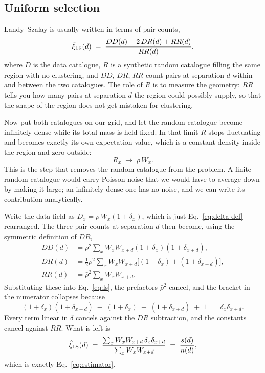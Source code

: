 \documentclass[12pt]{article}
\newcommand{\W}{W}
\begin{document}
\subsection{Uniform selection}\label{sec:ls-uniform}

Landy--Szalay is usually written in terms of pair counts,
\begin{equation}\label{eq:ls}
  \hat\xi_{\rm LS}(d) \;=\; \frac{DD(d) - 2\,DR(d) + RR(d)}{RR(d)} ,
\end{equation}
where $D$ is the data catalogue, $R$ is a synthetic random catalogue filling
the same region with no clustering, and $DD$, $DR$, $RR$ count pairs at
separation $d$ within and between the two catalogues.  The role of $R$ is to
measure the geometry: $RR$ tells you how many pairs at separation $d$ the
region could possibly supply, so that the shape of the region does not get
mistaken for clustering.

Now put both catalogues on our grid, and let the random catalogue become
infinitely dense while its total mass is held fixed.  In that limit $R$ stops
fluctuating and becomes exactly its own expectation value, which is a
constant density inside the region and zero outside:
\begin{equation}\label{eq:R-limit}
  R_x \;\longrightarrow\; \bar\rho\, \W_x .
\end{equation}
This is the step that removes the random catalogue from the problem.  A finite
random catalogue would carry Poisson noise that we would have to average
down by making it large; an infinitely dense one has no noise, and we can
write its contribution analytically.

Write the data field as $D_x = \bar\rho\,\W_x (1 + \delta_x)$, which is
just Eq.~\eqref{eq:delta-def} rearranged.  The three pair counts at
separation $d$ then become, using the symmetric definition of $DR$,
\begin{align}
  DD(d) &= \bar\rho^2 \sum_x \W_x \W_{x+d} (1+\delta_x)(1+\delta_{x+d}),
          \label{eq:DD}\\
  DR(d) &= \tfrac{1}{2}\bar\rho^2 \sum_x \W_x \W_{x+d}
           \big[(1+\delta_x) + (1+\delta_{x+d})\big],
          \label{eq:DR}\\
  RR(d) &= \bar\rho^2 \sum_x \W_x \W_{x+d} .
          \label{eq:RR}
\end{align}
Substituting these into Eq.~\eqref{eq:ls}, the prefactors $\bar\rho^2$
cancel, and the bracket in the numerator collapses because
\begin{equation}\label{eq:ls-algebra}
  (1+\delta_x)(1+\delta_{x+d})
  \;-\; (1+\delta_x) \;-\; (1+\delta_{x+d}) \;+\; 1
  \;=\; \delta_x \delta_{x+d} .
\end{equation}
Every term linear in $\delta$ cancels against the $DR$ subtraction, and the
constants cancel against $RR$.  What is left is
\begin{equation}\label{eq:ls-equals-ours}
  \hat\xi_{\rm LS}(d)
  \;=\; \frac{\sum_x \W_x \W_{x+d}\, \delta_x \delta_{x+d}}
             {\sum_x \W_x \W_{x+d}}
  \;=\; \frac{s(d)}{n(d)},
\end{equation}
which is exactly Eq.~\eqref{eq:estimator}.
\end{document}
